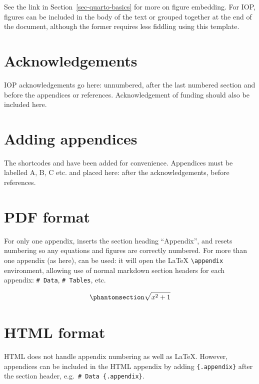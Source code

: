\documentclass[
  12pt]{iopart}
\begin{document}
See the link in Section~\ref{sec-quarto-basics} for more on figure
embedding. For IOP, figures can be included in the body of the text or
grouped together at the end of the document, although the former
requires less fiddling using this template.

\section*{Acknowledgements}\label{sec-ack}

IOP acknowledgements go here: unnumbered, after the last numbered
section and before the appendices or references. Acknowledgement of
funding should also be included here.

\section{Adding appendices}\label{adding-appendices}

The shortcodes {} and {} have been added for convenience. Appendices
must be labelled A, B, C etc. and placed here: after the
acknowledgements, before references.

\appendix

\section{PDF format}\label{pdf-format}

For only one appendix, {} inserts the section heading ``Appendix'', and
resets numbering so any equations and figures are correctly numbered.
For more than one appendix (as here), {} can be used: it will open the
{\LaTeX} \texttt{\textbackslash{}appendix} environment, allowing use of
normal markdown section headers for each appendix: \texttt{\#\ Data},
\texttt{\#\ Tables}, etc.

\begin{equation}\phantomsection\label{eq-app}{
\sqrt{x^2+1}
}\end{equation}

\section{HTML format}\label{html-format}

HTML does not handle appendix numbering as well as {\LaTeX}. However,
appendices can be included in the HTML appendix by adding
\texttt{\{.appendix\}} after the section header,
e.g.~\texttt{\#\ Data\ \{.appendix\}}.


  
\end{document}
